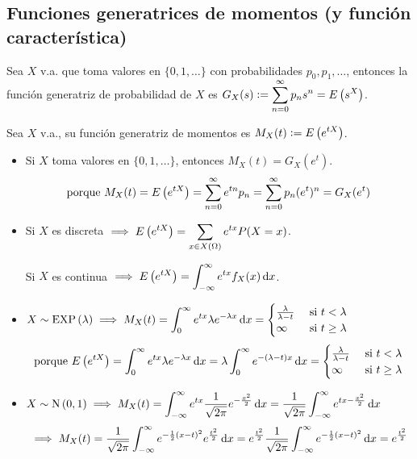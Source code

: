 \subsection{Funciones generatrices de momentos (y función característica)}

 Sea $X$ v.a. que toma valores en $\{0, 1, \dots\}$ con probabilidades $p_0, p_1, \dots$, entonces la función generatriz de probabilidad de $X$ es $\displaystyle G_X(s) \vcentcolon= \sum_{n=0}^{\infty} p_n s^n = E\left(s^X\right)$.

\begin{defn}
	Sea $X$ v.a., su función generatriz de momentos  es $\displaystyle M_X(t) \vcentcolon= E\left(e^{tX}\right)$.
\end{defn}

\begin{obs}
	\begin{itemize}
		\item Si $X$ toma valores en $\{0, 1, \dots\}$, entonces $M_X(t) = G_X(e^t)$.
		      \[\text{porque }M_X(t) = E\left(e^{tX}\right) = \sum_{n=0}^{\infty} e^{tn}p_n = \sum_{n=0}^{\infty} p_n (e^t)^n = G_X(e^t)\]
		\item Si $X$ es discreta $\displaystyle \implies E\left(e^{tX}\right) = \sum_{x \in X(\Omega)} e^{tx}P(X=x)$.

		      Si $X$ es continua $\ds \implies E\left(e^{tX}\right) = \int_{-\infty}^{\infty} e^{tx}f_X(x)\odif{x}$.
	\end{itemize}
\end{obs}

\begin{ejem}
	\begin{itemize}
		\item $\ds X\sim \EXP{\lambda} \implies M_X(t) = \int_{0}^{\infty} e^{tx}\lambda e^{-\lambda x}\odif{x} = \begin{cases}
				      \frac{\lambda}{\lambda - t} & \tex{ si } t < \lambda    \\
				      \infty                      & \tex{ si } t \geq \lambda
			      \end{cases}$
		      \[\tex{porque } E\left(e^{tX}\right) = \int_{0}^{\infty} e^{tx}\lambda e^{-\lambda x}\odif{x} = \lambda \int_{0}^{\infty} e^{-(\lambda - t)x}\odif{x} = \begin{cases}
				      \frac{\lambda}{\lambda - t} & \tex{ si } t < \lambda    \\
				      \infty                      & \tex{ si } t \geq \lambda
			      \end{cases}\]
		\item $\ds X\sim \normal{0,1} \implies M_X(t) = \int_{-\infty}^{\infty} e^{tx}\frac{1}{\sqrt{2\pi}}e^{-\frac{x^2}{2}}\odif{x} = \frac{1}{\sqrt{2\pi}}\int_{-\infty}^{\infty} e^{tx-\frac{x^2}{2}}\odif{x}$
		      \[\implies M_X(t) = \frac{1}{\sqrt{2\pi}} \int_{-\infty}^{\infty} e^{-\frac{1}{2}\left(x-t\right)^2} e^{\frac{t^2}{2}}\odif{x} = e^{\frac{t^2}{2}} \frac{1}{\sqrt{2\pi}} \int_{-\infty}^{\infty} e^{-\frac{1}{2}\left(x-t\right)^2}\odif{x} = e^{\frac{t^2}{2}}\]
	\end{itemize}
\end{ejem}

